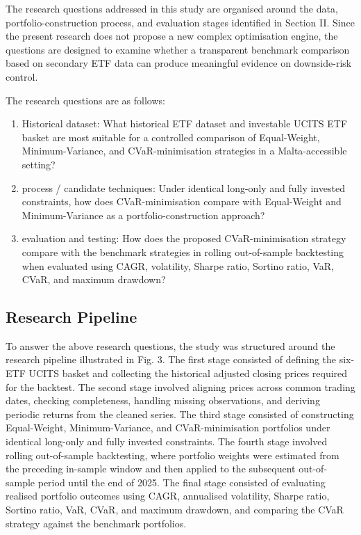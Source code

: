 \par The research questions addressed in this study are organised around the data, portfolio-construction process, and evaluation stages identified in Section II. Since the present research does not propose a new complex optimisation engine, the questions are designed to examine whether a transparent benchmark comparison based on secondary ETF data can produce meaningful evidence on downside-risk control. 
\par The research questions are as follows:
\begin{enumerate}
    \item Historical dataset: What historical ETF dataset and investable UCITS ETF basket are most suitable for a controlled comparison of Equal-Weight, Minimum-Variance, and CVaR-minimisation strategies in a Malta-accessible setting? 
    \item process / candidate techniques: Under identical long-only and fully invested constraints, how does CVaR-minimisation compare with Equal-Weight and Minimum-Variance as a portfolio-construction approach? 
    \item evaluation and testing: How does the proposed CVaR-minimisation strategy compare with the benchmark strategies in rolling out-of-sample backtesting when evaluated using CAGR, volatility, Sharpe ratio, Sortino ratio, VaR, CVaR, and maximum drawdown? 
\end{enumerate}

\subsection{Research Pipeline}

\par To answer the above research questions, the study was structured around the research pipeline illustrated in Fig. 3. The first stage consisted of defining the six-ETF UCITS basket and collecting the historical adjusted closing prices required for the backtest. The second stage involved aligning prices across common trading dates, checking completeness, handling missing observations, and deriving periodic returns from the cleaned series. The third stage consisted of constructing Equal-Weight, Minimum-Variance, and CVaR-minimisation portfolios under identical long-only and fully invested constraints. The fourth stage involved rolling out-of-sample backtesting, where portfolio weights were estimated from the preceding in-sample window and then applied to the subsequent out-of-sample period until the end of 2025. The final stage consisted of evaluating realised portfolio outcomes using CAGR, annualised volatility, Sharpe ratio, Sortino ratio, VaR, CVaR, and maximum drawdown, and comparing the CVaR strategy against the benchmark portfolios.

